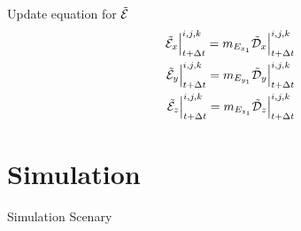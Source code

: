 \documentclass[aspectratio=169]{beamer}
\begin{document}
\begin{frame}{Update equation for $\tilde{\mathcal{E}}$}
  \begin{align}
    \tilde{\mathcal{E}}_x\Big|^{i,j,k}_{t+\Delta t} = m_{E_{x_1}} \tilde{\mathcal{D}}_x\Big|^{i,j,k}_{t+\Delta t} \\
    \tilde{\mathcal{E}}_y\Big|^{i,j,k}_{t+\Delta t} = m_{E_{y_1}} \tilde{\mathcal{D}}_y\Big|^{i,j,k}_{t+\Delta t} \\
    \tilde{\mathcal{E}}_z\Big|^{i,j,k}_{t+\Delta t} = m_{E_{z_1}} \tilde{\mathcal{D}}_z\Big|^{i,j,k}_{t+\Delta t}
\end{align}
\end{frame}

\section{Simulation}
\begin{frame}{Simulation Scenary}
    \centering
      \resizebox{!}{0.5\textheight}
      {
        \centering
        
      }

      \resizebox{0.7\textwidth}{!}
      { 
        
        
      }
\end{frame}
\end{document}
